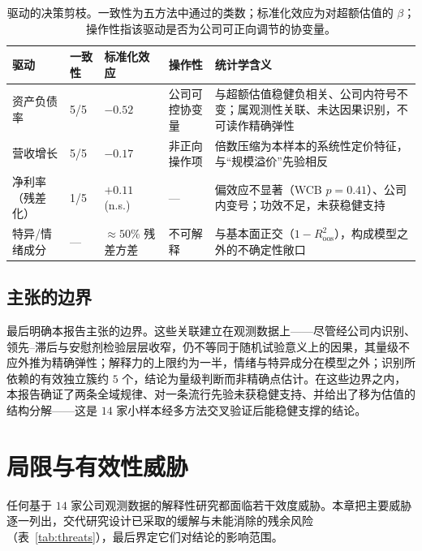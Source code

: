 \documentclass[UTF8, a4paper, fontset=none, zihao=-4]{ctexrep}
\begin{document}
\begin{table}[htbp]
\caption{驱动的决策剪枝。一致性为五方法中通过的类数；标准化效应为对超额估值的 $\beta$；操作性指该驱动是否为公司可正向调节的协变量。}
\label{tab:prune}
\footnotesize
\renewcommand{\arraystretch}{1.5}
\setlength{\tabcolsep}{5pt}
\begin{tabularx}{\textwidth}{@{}llllX@{}}
\toprule
\textbf{\color{brandblue}驱动} & \textbf{\color{brandblue}一致性} & \textbf{\color{brandblue}标准化效应} & \textbf{\color{brandblue}操作性} & \textbf{\color{brandblue}统计学含义} \\
\midrule
资产负债率 & \cellcolor{okbg}5/5 & $-0.52$ & 公司可控协变量 & 与超额估值稳健负相关、公司内符号不变；属观测性关联、未达因果识别，不可读作精确弹性 \\
营收增长 & \cellcolor{okbg}5/5 & $-0.17$ & 非正向操作项 & 倍数压缩为本样本的系统性定价特征，与“规模溢价”先验相反 \\
净利率（残差化） & \cellcolor{nobg}1/5 & $+0.11$ (n.s.) & --- & 偏效应不显著（WCB $p{=}0.41$）、公司内变号；功效不足，未获稳健支持 \\
特异/情绪成分 & --- & $\approx\!50\%$ 残差方差 & 不可解释 & 与基本面正交（$1-R^2_{\text{oos}}$），构成模型之外的不确定性敞口 \\
\bottomrule
\end{tabularx}
\end{table}

\section{主张的边界}
最后明确本报告主张的边界。这些关联建立在观测数据上——尽管经公司内识别、领先--滞后与安慰剂检验层层收窄，仍不等同于随机试验意义上的因果，其量级不应外推为精确弹性；解释力的上限约为一半，情绪与特异成分在模型之外；识别所依赖的有效独立簇约 $5$ 个，结论为量级判断而非精确点估计。在这些边界之内，本报告确证了两条全域规律、对一条流行先验未获稳健支持、并给出了移为估值的结构分解——这是 $14$ 家小样本经多方法交叉验证后能稳健支撑的结论。

\chapter{局限与有效性威胁}\label{ch:limitations}
任何基于 $14$ 家公司观测数据的解释性研究都面临若干效度威胁。本章把主要威胁逐一列出，交代研究设计已采取的缓解与未能消除的残余风险（表~\ref{tab:threats}），最后界定它们对结论的影响范围。
\end{document}
